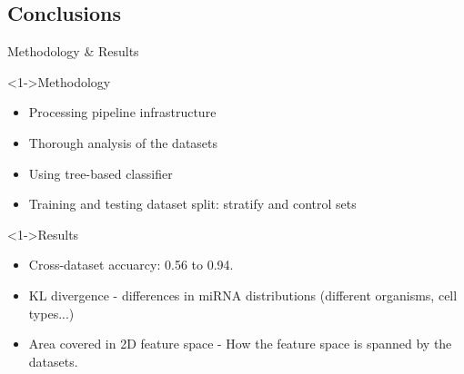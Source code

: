 \documentclass{beamer}
\begin{document}
\subsection{Conclusions}
\begin{frame}{Methodology \& Results}

\begin{exampleblock}
		<1->{Methodology}
\begin{itemize}
\item Processing pipeline infrastructure
\item Thorough analysis of the datasets
\item Using tree-based classifier
\item Training and testing dataset split: stratify and control sets
\end{itemize}
\end{exampleblock}
\pause

\begin{exampleblock}
		<1->{Results}
\begin{itemize}
\item Cross-dataset accuarcy: 0.56 to 0.94. 
\item KL divergence - differences in miRNA distributions (different organisms, cell types...)
\item Area covered in 2D feature space - How the feature space is spanned by the datasets.
\end{itemize}


\end{exampleblock}

\end{frame}




\end{document}
